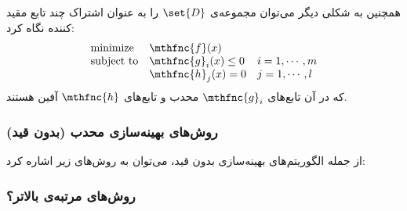 \documentclass[a4paper,11px]{article}
\newcommand{\basepath}{../}
\begin{document}
همچنین به شکلی دیگر می‌توان مجموعه‌ی
$\set{D}$
را به عنوان اشتراک چند تابع مقید کننده نگاه کرد:
\[
\begin{array}{lll}
\mbox{minimize} & \mthfnc{f}( x )\\
\mbox{subject to} & \mthfnc{g}_i(x) \leq 0 & i = 1, \cdots, m\\
 & \mthfnc{h}_j(x) = 0 & j = 1, \cdots, l
\end{array}
\]
که در آن تابع‌های
$\mthfnc{g}_i$
محدب و تابع‌های
$\mthfnc{h}$
آفین هستند.


\subsubsection{
روش‌های بهینه‌سازی محدب (بدون قید)
}
از جمله الگوریتم‌های بهینه‌سازی بدون قید، می‌توان به روش‌های زیر اشاره کرد:

\subsubsection{
روش‌های مرتبه‌ی بالاتر؟
}










\end{document}
